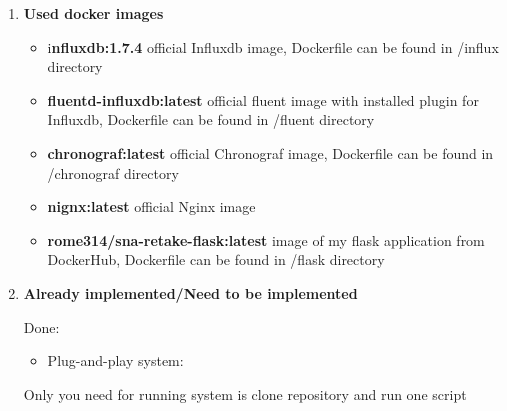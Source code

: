 \documentclass[12pt]{article}
\renewcommand{\_}{\kern-1.5pt\textunderscore\kern-1.5pt}
\begin{document}
\begin{enumerate}
\vspace{\baselineskip}

\vspace{\baselineskip}

\vspace{\baselineskip}
	\item \textbf{Used docker images}\par

\begin{itemize}
	\item i\textbf{nfluxdb:1.7.4} official Influxdb image, Dockerfile can be found in /influx directory\par

	\item \textbf{fluentd-influxdb:latest }official fluent image with installed plugin for Influxdb, Dockerfile can be found in /fluent directory\par

	\item \textbf{chronograf:latest} official Chronograf image, Dockerfile can be found in /chronograf directory\par

	\item \textbf{nignx:latest }official Nginx image\par

	\item \textbf{rome314/sna-retake-flask:latest }image of my flask application from DockerHub, Dockerfile can be found in /flask directory
\end{itemize}\par


\vspace{\baselineskip}
	\item \textbf{Already implemented/Need to be implemented}\par


\vspace{\baselineskip}
\begin{FlushLeft}
Done:
\end{FlushLeft}\par

\begin{itemize}
	\item Plug-and-play system:
\end{itemize}\par

\begin{adjustwidth}{1.0in}{0.0in}
\begin{FlushLeft}
Only you need for running system is clone repository and run one script
\end{FlushLeft}\par


\end{adjustwidth}
\end{enumerate}
\end{document}

